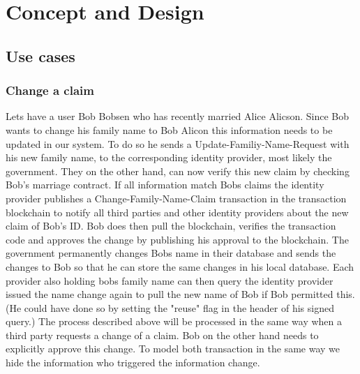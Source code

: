 \chapter{Concept and Design}
\label{cha:conceptanddesign}

\section{Use cases}

\subsection{Change a claim}
Lets have a user Bob Bobsen who has recently married Alice Alicson. Since Bob wants to change his family name to Bob Alicon this information needs to be updated in our system. To do so he sends a Update-Familiy-Name-Request with his new family name, to the corresponding identity provider, most likely the government. They on the other hand, can now verify this new claim by checking Bob's marriage contract. If all information match Bobs claims the identity provider publishes a Change-Family-Name-Claim transaction in the transaction blockchain to notify all third parties and other identity providers about the new claim of Bob's ID. 
Bob does then pull the blockchain, verifies the transaction code and approves the change by publishing his approval to the blockchain. The government permanently changes Bobs name in their database and sends the changes to Bob so that he can store the same changes in his local database. 
Each provider also holding bobs family name can then query the identity provider issued the name change again to pull the new name of Bob if Bob permitted this. (He could have done so by setting the "reuse" flag in the header of his signed query.)
The process described above will be processed in the same way when a third party requests a change of a claim. Bob on the other hand needs to explicitly approve this change. To model both transaction in the same way we hide the information who triggered the information change.   
